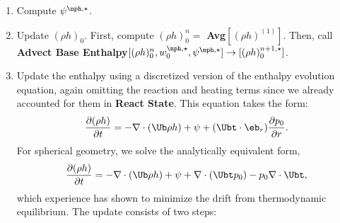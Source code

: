 \begin{description}
\begin{enumerate}
\item Compute $\psi^{\nph,\star}$.

\item Update $(\rho h)_0$.  First, compute $(\rho h)_0^n = $ {\bf Avg}$[(\rho h)^{(1)}]$.
Then, call\\
{\bf Advect Base Enthalpy}$[(\rho h)_0^{n}, w_0^{\nph,\star}, \psi^{\nph,\star}] \rightarrow [(\rho h)_0^{n+1,\star}]$.

\item Update the enthalpy using a discretized version of the enthalpy
evolution equation, again omitting the reaction and heating terms
since we already accounted for
them in {\bf React State}.  This equation takes the form:
\begin{equation}
\frac{\partial (\rho h)}{\partial t}  = - \nabla \cdot (\Ub \rho h) + \psi + (\Ubt \cdot \eb_r) \frac{\partial p_0}{\partial r}.
\end{equation}
For spherical geometry, we solve the
analytically equivalent form,
\begin{equation}
\frac{\partial (\rho h)}{\partial t}  = - \nabla \cdot (\Ub \rho h) + \psi + \nabla \cdot (\Ubt p_0) - p_0 \nabla \cdot \Ubt,
\end{equation}
which experience has shown to minimize the drift from thermodynamic
equilibrium.  The update consists of two steps:


\end{enumerate}
\end{description}
